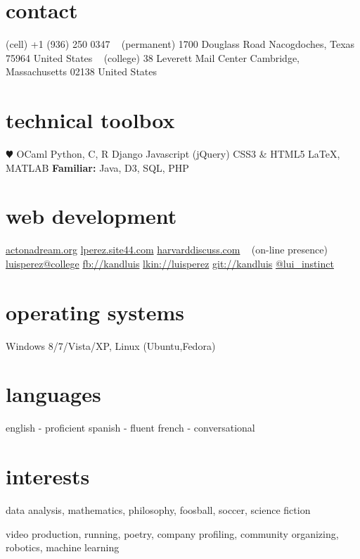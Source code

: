 \documentclass[]{friggeri-cv} %
\begin{document}


\begin{aside} %
\section{contact}
(cell)
+1 (936) 250 0347
~
(permanent)
1700 Douglass Road
Nacogdoches, Texas 75964
United States
~
(college)
38 Leverett Mail Center
Cambridge, Massachusetts 02138
United States
\section{technical toolbox}
{\color{red} $\varheartsuit$} OCaml
Python, C, R
Django
Javascript (jQuery)
CSS3 \& HTML5
\LaTeX, MATLAB
\textbf{Familiar:} Java, D3, SQL, PHP
\section{web development}
\href{http://www.actonadream.org/}{actonadream.org}
\href{http://lperez.site44.com}{lperez.site44.com}
\href{https://www.hcs.harvard.edu/~harvarddiscuss/index.php/en/}{harvarddiscuss.com}
~
(on-line presence)
\href{mailto:luisperez@college.harvard.edu}{luisperez@college}
\href{http://facebook.com/kandluis}{fb://kandluis}
\href{http://www.linkedin.com/pub/luis-perez/73/793/770}{lkin://luisperez}
\href{http://www.github.com/kandluis}{git://kandluis}
\href{http://www.twitter.com/lui\_instinct}{@lui\_instinct}
\section{operating systems}
Windows 8/7/Vista/XP, Linux (Ubuntu,Fedora)
\section{languages}
english - proficient
spanish - fluent
french - conversational
\section{interests}
data analysis, mathematics, philosophy, foosball, soccer, science fiction
\begin{detailed} 
video production, running, poetry, company profiling,  community organizing, robotics, machine learning
\end{detailed}
\end{aside}
\end{document}
